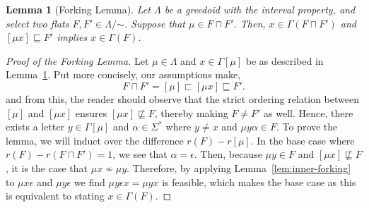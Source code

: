 \documentclass[10pt,a4paper]{amsart}
\newtheorem{lemma}{Lemma}
\newcommand{\glang}{\Lambda}
\newcommand{\univ}{\Sigma}
\begin{document}
\begin{lemma}[Forking Lemma]\label{lem:forking}
    Let $\glang$ be a greedoid with the interval property, and select two flats $F, F'\in\glang/\mathord{\sim}$.
    Suppose that $\mu \in F\sqcap F'$.
    Then, $x \in \Gamma(F\sqcap F')$ and $[\mu x] \sqsubseteq F'$ implies $x \in \Gamma(F)$.
\end{lemma}

\begin{proof}[Proof of the Forking Lemma]
    Let $\mu \in \glang$ and $x \in \Gamma[\mu]$ be as described in Lemma~\ref{lem:forking}.
    Put more concisely, our assumptions make,
    $$F\sqcap F' = [\mu] \sqsubset [\mu x] \sqsubseteq F'.$$
    and from this, the reader should observe that the strict ordering relation between $[\mu]$ and $[\mu x]$ ensures $[\mu x] \not\sqsubseteq F$, thereby making $F \neq F'$ as well.
    Hence, there exists a letter $y \in \Gamma[\mu]$ and $\alpha \in \univ^*$ where $y \neq x$ and $\mu y \alpha \in F$.
    To prove the lemma, we will induct over the difference $r(F) - r[\mu]$.
    In the base case where $r(F) - r(F\sqcap F') = 1$, we see that $\alpha = \epsilon$.
    Then, because $\mu y \in F$ and $[\mu x] \not \sqsubseteq F$, it is the case that $\mu x \not\sim \mu y$.
    Therefore, by applying Lemma~\ref{lem:inner-forking} to $\mu x \epsilon$ and $\mu y \epsilon$ we find $\mu y \epsilon x = \mu y x$ is feasible, which makes the base case as this is equivalent to stating $x \in \Gamma(F)$.


\end{proof}
\end{document}
